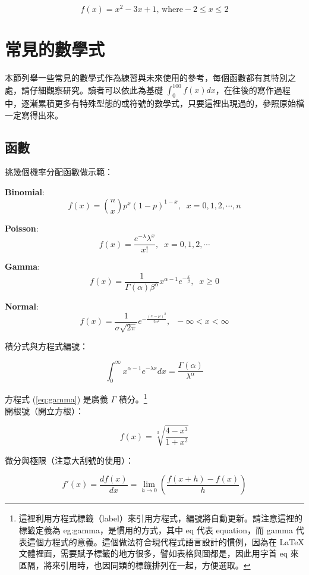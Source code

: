 $$f(x)=x^2-3x+1 \mbox{, where}  -2 \leq x \leq 2$$

\section{常見的數學式}
本節列舉一些常見的數學式作為練習與未來使用的參考，每個函數都有其特別之處，請仔細觀察研究。讀者可以依此為基礎 $\displaystyle\int_0^{100} f(x)dx$，在往後的寫作過程中，逐漸累積更多有特殊型態的或符號的數學式，只要這裡出現過的，參照原始檔一定寫得出來。


\subsection{函數}
挑幾個機率分配函數做示範：

\textbf{Binomial}: 
$$f(x)={n\choose x}p^x(1-p)^{1-x}, \;\; x=0,1,2,\cdots,n$$ 

\textbf{Poisson}: 
$$f(x)=\frac{e^{-\lambda}\lambda^x}{x!}, \;\;  x=0,1,2,\cdots$$ 

\textbf{Gamma}: 
$$f(x)=\frac{1}{\Gamma(\alpha)\beta^\alpha}x^{\alpha-1}e^{-\frac{x}{\beta}}, \;\; x\geq 0$$

\textbf{Normal}: 
$$f(x)=\frac{1}{\sigma\sqrt{2\pi}}e^{-\frac{(x-\mu)^2}{2\sigma^2}}, \;\;  -\infty < x < \infty $$

\bigskip
積分式與方程式編號：
  
  \begin{equation}\label{eq:gamma}%
  \int^\infty_0 x^{\alpha-1}e^{-\lambda x} dx = \frac{\Gamma(\alpha)}{\lambda^{\alpha}}
  \end{equation}

方程式  (\ref{eq:gamma}) 是廣義 $\Gamma$ 積分。\footnote{這裡利用方程式標籤（label）來引用方程式，編號將自動更新。請注意這裡的標籤定義為 eg:gamma，是慣用的方式，其中 eq 代表 equation，而 gamma 代表這個方程式的意義。這個做法符合現代程式語言設計的慣例，因為在 \LaTeX 文體裡面，需要賦予標籤的地方很多，譬如表格與圖都是，因此用字首 eq 來區隔，將來引用時，也因同類的標籤排列在一起，方便選取。}\\
  
 開根號（開立方根）：
  
  $$f(x)=\sqrt[3]{\frac {\displaystyle 4-x^{3}}{\displaystyle 1+x^{2}}}$$
  
 微分與極限（注意大刮號的使用）：
  
  $$f'(x)=\frac{df(x)}{dx}=\lim_{h\rightarrow 0}\left(\frac{f(x+h)-f(x)}{h}\right)$$
  
